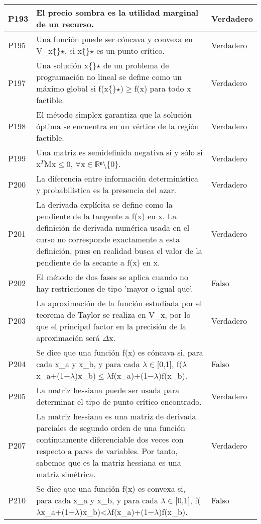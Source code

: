 \documentclass{article}
\begin{document}
\begin{longtable}{|p{1.5cm}|p{14cm}|p{2cm}|}
P193 & El precio sombra es la utilidad marginal de un recurso. & Verdadero \\ \hline
P195 & Una función puede ser cóncava y convexa en V\_x\^\{\}$\star$, si x\^\{\}$\star$ es un punto crítico. & Verdadero \\ \hline
P197 & Una solución x\^\{\}$\star$ de un problema de programación no lineal se define como un máximo global si f(x\^\{\}$\star$)$\geq$f(x) para todo x factible. & Verdadero \\ \hline
P198 & El método simplex garantiza que la solución óptima se encuentra en un vértice de la región factible. & Verdadero \\ \hline
P199 & Una matriz es semidefinida negativa si y sólo si x$^T$Mx$\leq$0, $\forall$x$\in$$\mathbb{R}$ⁿ$\setminus$\{0\}. & Verdadero \\ \hline
P200 & La diferencia entre información determinística y probabilística es la presencia del azar. & Verdadero \\ \hline
P201 & La derivada explícita se define como la pendiente de la tangente a f(x) en x. La definición de derivada numérica usada en el curso no corresponde exactamente a esta definición, pues en realidad busca el valor de la pendiente de la secante a f(x) en x. & Verdadero \\ \hline
P202 & El método de dos fases se aplica cuando no hay restricciones de tipo 'mayor o igual que'. & Falso \\ \hline
P203 & La aproximación de la función estudiada por el teorema de Taylor se realiza en V\_x, por lo que el principal factor en la precisión de la aproximación será $\Delta$x. & Verdadero \\ \hline
P204 & Se dice que una función f(x) es cóncava si, para cada x\_a y x\_b, y para cada $\lambda$$\in$[0,1], f($\lambda$x\_a+(1−$\lambda$)x\_b)$\leq$$\lambda$f(x\_a)+(1−$\lambda$)f(x\_b). & Falso \\ \hline
P205 & La matriz hessiana puede ser usada para determinar el tipo de punto crítico encontrado. & Verdadero \\ \hline
P207 & La matriz hessiana es una matriz de derivada parciales de segundo orden de una función continuamente diferenciable dos veces con respecto a pares de variables. Por tanto, sabemos que es la matriz hessiana es una matriz simétrica. & Verdadero \\ \hline
P210 & Se dice que una función f(x) es convexa si, para cada x\_a y x\_b, y para cada $\lambda$$\in$[0,1], f($\lambda$x\_a+(1−$\lambda$)x\_b)<$\lambda$f(x\_a)+(1−$\lambda$)f(x\_b). & Falso \\ \hline

\end{longtable}
\end{document}
